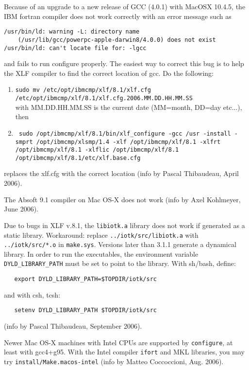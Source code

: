 \documentclass[12pt,a4paper]{article}
\begin{document}
Because of an upgrade to a new release of GCC (4.0.1) with MacOSX 10.4.5, 
the IBM fortran compiler does not work correctly with an error message
such as
\begin{verbatim}
/usr/bin/ld: warning -L: directory name 
    (/usr/lib/gcc/powerpc-apple-darwin8/4.0.0) does not exist
/usr/bin/ld: can't locate file for: -lgcc
\end{verbatim}
and fails to run configure properly. The easiest way to correct this bug 
is to help the XLF compiler to find the correct location of gcc. Do the
following:
\begin{enumerate}
\item {\tt sudo mv /etc/opt/ibmcmp/xlf/8.1/xlf.cfg \\
                   /etc/opt/ibmcmp/xlf/8.1/xlf.cfg.2006.MM.DD.HH.MM.SS} \\
with MM.DD.HH.MM.SS is the current date (MM=month, DD=day etc...), then
\item {\tt
sudo /opt/ibmcmp/xlf/8.1/bin/xlf\_configure -gcc /usr -install -smprt 
    /opt/ibmcmp/xlsmp/1.4 -xlf /opt/ibmcmp/xlf/8.1 -xlfrt 
    /opt/ibmcmp/xlf/8.1 -xlflic /opt/ibmcmp/xlf/8.1  \\
   /opt/ibmcmp/xlf/8.1/etc/xlf.base.cfg}
\end{enumerate}
replaces the xlf.cfg with the correct location (info by Pascal 
Thibaudeau, April 2006).

The Absoft 9.1 compiler on Mac OS-X does not work (info by Axel
Kohlmeyer, June 2006).

Due to bugs in XLF v.8.1, the \texttt{libiotk.a} library does not work 
if generated as a static library. Workaround: replace
\texttt{../iotk/src/libiotk.a} with \texttt{../iotk/src/*.o} in
\texttt{make.sys}. Versions later than 3.1.1 generate a dynamical 
library. In order to run the executables, the environment variable 
\texttt{DYLD\_LIBRARY\_PATH} must be set to point to the library. 
With sh/bash, define:
\begin{verbatim}
   export DYLD_LIBRARY_PATH=$TOPDIR/iotk/src
\end{verbatim}
and with csh, tcsh:
\begin{verbatim}
   setenv DYLD_LIBRARY_PATH $TOPDIR/iotk/src
\end{verbatim}
(info by Pascal Thibaudeau, September 2006).

Newer Mac OS-X machines with Intel CPUs  are supported by \texttt{configure},
at least with gcc4+g95. With the Intel compiler \texttt{ifort} and 
MKL libraries, you may try \texttt{install/Make.macos-intel} 
(info by Matteo Coccoccioni, Aug. 2006).
\end{document}
